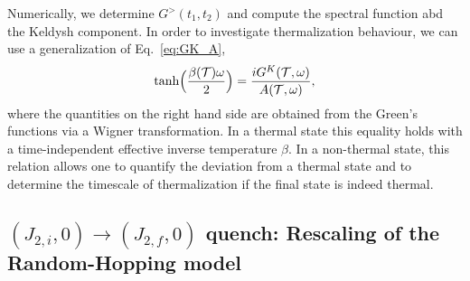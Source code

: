 \documentclass[prx,aps,onecolumn,amsfonts,showpacs,superscriptaddress,preprint,eqsecnum]
{revtex4-1}
\begin{document}
Numerically, we determine $G^>(t_1, t_2)$  and compute the spectral function abd the Keldysh component. 
In order to investigate thermalization behaviour, we can use a generalization of Eq.~\eqref{eq:GK_A},
\begin{equation}
	\operatorname{tanh}\Bigl(\frac{\beta(\mathcal{T}) \omega}{2}\Bigr) = 
\frac{iG^K(\mathcal{T},\omega)}{A(\mathcal{T}, \omega)},
\label{eq:Thermometer}
\end{equation}
where the quantities on the right hand side are obtained from the Green's functions via a Wigner transformation. In a thermal state this equality holds with a time-independent effective inverse temperature $\beta$. In a non-thermal state, this relation allows one to quantify the deviation from a thermal state and to determine the timescale of thermalization if the final state is indeed thermal.


\subsection{$(J_{2,i},0) \rightarrow (J_{2,f},0)$ quench: Rescaling of the Random-Hopping model}
\end{document}
